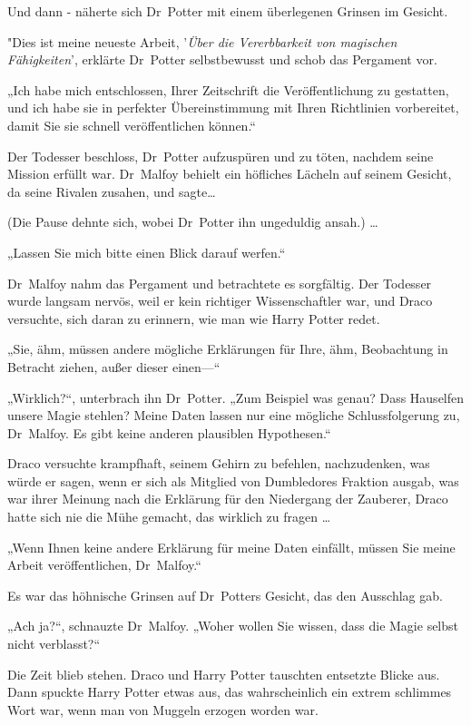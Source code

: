 {Und dann - näherte sich Dr~Potter mit einem überlegenen Grinsen im Gesicht.

"Dies ist meine neueste Arbeit, '\emph{Über die Vererbbarkeit von magischen Fähigkeiten}', erklärte Dr~Potter selbstbewusst und schob das Pergament vor.

„Ich habe mich entschlossen, Ihrer Zeitschrift die Veröffentlichung zu gestatten, und ich habe sie in perfekter Übereinstimmung mit Ihren Richtlinien vorbereitet, damit Sie sie schnell veröffentlichen können.“

Der Todesser beschloss, Dr~Potter aufzuspüren und zu töten, nachdem seine Mission erfüllt war. Dr~Malfoy behielt ein höfliches Lächeln auf seinem Gesicht, da seine Rivalen zusahen, und sagte…

(Die Pause dehnte sich, wobei Dr~Potter ihn ungeduldig ansah.) …

„Lassen Sie mich bitte einen Blick darauf werfen.“

Dr~Malfoy nahm das Pergament und betrachtete es sorgfältig. Der Todesser wurde langsam nervös, weil er kein richtiger Wissenschaftler war, und Draco versuchte, sich daran zu erinnern, wie man wie Harry Potter redet.

„Sie, ähm, müssen andere mögliche Erklärungen für Ihre, ähm, Beobachtung in Betracht ziehen, außer dieser einen—“

„Wirklich?“, unterbrach ihn Dr~Potter. „Zum Beispiel was genau? Dass Hauselfen unsere Magie stehlen? Meine Daten lassen nur eine mögliche Schlussfolgerung zu, Dr~Malfoy. Es gibt keine anderen plausiblen Hypothesen.“

Draco versuchte krampfhaft, seinem Gehirn zu befehlen, nachzudenken, was würde er sagen, wenn er sich als Mitglied von Dumbledores Fraktion ausgab, was war ihrer Meinung nach die Erklärung für den Niedergang der Zauberer, Draco hatte sich nie die Mühe gemacht, das wirklich zu fragen …

„Wenn Ihnen keine andere Erklärung für meine Daten einfällt, müssen Sie meine Arbeit veröffentlichen, Dr~Malfoy.“

Es war das höhnische Grinsen auf Dr~Potters Gesicht, das den Ausschlag gab.

„Ach ja?“, schnauzte Dr~Malfoy. „Woher wollen Sie wissen, dass die Magie selbst nicht verblasst?“

Die Zeit blieb stehen. Draco und Harry Potter tauschten entsetzte Blicke aus. Dann spuckte Harry Potter etwas aus, das wahrscheinlich ein extrem schlimmes Wort war, wenn man von Muggeln erzogen worden war.

}
